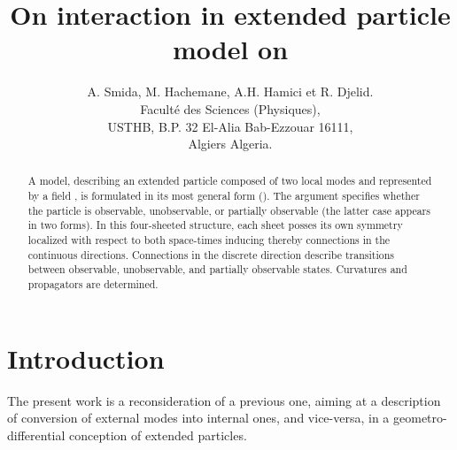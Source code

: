 \documentclass[12pt,a4paper]{article}
\begin{document}
\title{On interaction in extended particle model on \coordHE{}}
\author{A. Smida, M. Hachemane, A.H. Hamici et R. Djelid.\\Facult\'{e} des Sciences (Physiques),\\USTHB, B.P. 32 El-Alia Bab-Ezzouar 16111,\\Algiers Algeria.}
\maketitle
\begin{abstract}
A \coordHE{} model, describing an
extended particle composed of two local modes and represented by a field
\coordHE{}, is formulated in its most general form
(\coordHE{}). The \coordHE{} argument specifies whether the particle is observable,
unobservable, or partially observable (the latter case appears in two forms).
In this four-sheeted structure, each sheet posses its own symmetry localized
with respect to both space-times \coordHE{} inducing thereby connections in the
continuous directions. Connections in the discrete direction describe
transitions between observable, unobservable, and partially observable states.
Curvatures and propagators are determined.
\end{abstract}



\section{Introduction}

The present work is a reconsideration of a previous one,\cite{Smida 2000}
aiming at a description of conversion of external modes into internal ones,
and vice-versa, in a geometro-differential conception of extended particles.
\end{document}
